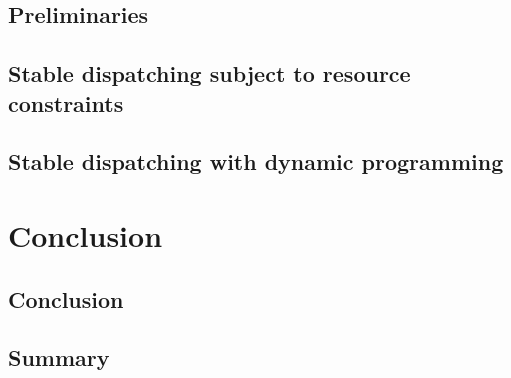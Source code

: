 \documentclass[9pt]{book}
\begin{document}
\chapter{Preliminaries}
\label{chapter/prelim-2}


\chapter{Stable dispatching subject to resource constraints}
\label{chapter/mista-stability}


\chapter{Stable dispatching with dynamic programming}
\label{chapter/cpaior-stability}




\part{Conclusion}

\chapter{Conclusion}
\label{chapter/conclusion}


\chapter*{Summary}


 


\end{document}
